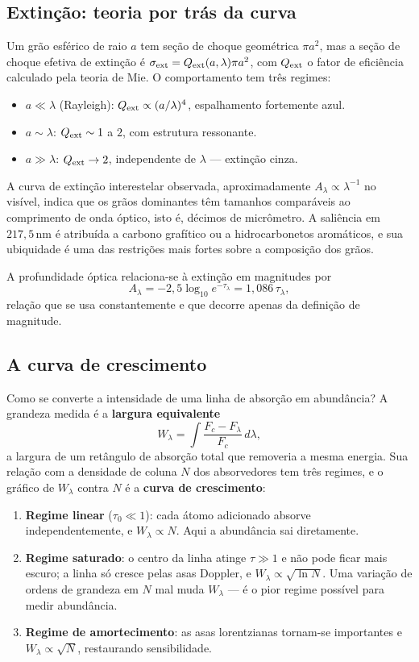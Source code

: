 \documentclass[11pt,a4paper]{article}
\begin{document}
\subsection*{Extinção: teoria por trás da curva}

Um grão esférico de raio $a$ tem seção de choque geométrica $\pi a^{2}$, mas a seção de choque efetiva de extinção é $\sigma_{\rm ext}=Q_{\rm ext}(a,\lambda)\pi a^{2}$, com $Q_{\rm ext}$ o fator de eficiência calculado pela teoria de Mie. O comportamento tem três regimes:
\begin{itemize}
\item $a\ll\lambda$ (Rayleigh): $Q_{\rm ext}\propto(a/\lambda)^{4}$, espalhamento fortemente azul.
\item $a\sim\lambda$: $Q_{\rm ext}\sim1$ a $2$, com estrutura ressonante.
\item $a\gg\lambda$: $Q_{\rm ext}\to2$, independente de $\lambda$ --- extinção cinza.
\end{itemize}
A curva de extinção interestelar observada, aproximadamente $A_\lambda\propto\lambda^{-1}$ no visível, indica que os grãos dominantes têm tamanhos comparáveis ao comprimento de onda óptico, isto é, décimos de micrômetro. A saliência em $217{,}5\,\mathrm{nm}$ é atribuída a carbono grafítico ou a hidrocarbonetos aromáticos, e sua ubiquidade é uma das restrições mais fortes sobre a composição dos grãos.

A profundidade óptica relaciona-se à extinção em magnitudes por
\[
A_\lambda=-2{,}5\log_{10}e^{-\tau_\lambda}=1{,}086\,\tau_\lambda,
\]
relação que se usa constantemente e que decorre apenas da definição de magnitude.

\subsection*{A curva de crescimento}

Como se converte a intensidade de uma linha de absorção em abundância? A grandeza medida é a \textbf{largura equivalente}
\[
W_\lambda=\int\frac{F_c-F_\lambda}{F_c}\,d\lambda,
\]
a largura de um retângulo de absorção total que removeria a mesma energia. Sua relação com a densidade de coluna $N$ dos absorvedores tem três regimes, e o gráfico de $W_\lambda$ contra $N$ é a \textbf{curva de crescimento}:

\begin{enumerate}
\item \textbf{Regime linear} ($\tau_0\ll1$): cada átomo adicionado absorve independentemente, e $W_\lambda\propto N$. Aqui a abundância sai diretamente.
\item \textbf{Regime saturado}: o centro da linha atinge $\tau\gg1$ e não pode ficar mais escuro; a linha só cresce pelas asas Doppler, e $W_\lambda\propto\sqrt{\ln N}$. Uma variação de ordens de grandeza em $N$ mal muda $W_\lambda$ --- é o pior regime possível para medir abundância.
\item \textbf{Regime de amortecimento}: as asas lorentzianas tornam-se importantes e $W_\lambda\propto\sqrt{N}$, restaurando sensibilidade.
\end{enumerate}
\end{document}
